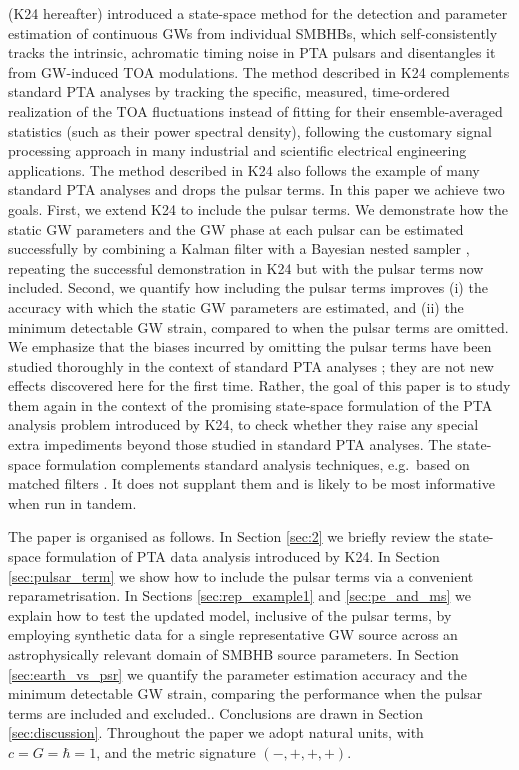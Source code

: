 \documentclass[fleqn,usenatbib,useAMS]{mnras}
\begin{document}
\cite{KimpsonPTA} (K24 hereafter) introduced a state-space method for the detection and parameter estimation of continuous GWs from individual SMBHBs, which self-consistently tracks the intrinsic, achromatic timing noise in PTA pulsars \citep[e.g.][]{Shannon2010,Lasky2015,Caballero2016,Goncharov2021} and disentangles it from GW-induced TOA modulations. The method described in K24 complements standard PTA analyses by tracking the specific, measured, time-ordered realization of the TOA fluctuations instead of fitting for their ensemble-averaged statistics (such as their power spectral density), following the customary signal processing approach in many industrial and scientific electrical engineering applications. The method described in K24 also follows the example of many standard PTA analyses and drops the pulsar terms. In this paper we achieve two goals. First, we extend K24 to include the pulsar terms. We demonstrate how the static GW parameters and the GW phase at each pulsar can be estimated successfully by combining a Kalman filter \citep{Kalman1} with a Bayesian nested sampler \citep{Skilling, Ashton2022}, repeating the successful demonstration in K24 but with the pulsar terms now included. Second, we quantify how including the pulsar terms improves (i) the accuracy with which the static GW parameters are estimated, and (ii) the minimum detectable GW strain, compared to when the pulsar terms are omitted. We emphasize that the biases incurred by omitting the pulsar terms have been studied thoroughly in the context of standard PTA analyses \citep{Zhupulsarterms,Chen2022}; they are not new effects discovered here for the first time. Rather, the goal of this paper is to study them again in the context of the promising state-space formulation of the PTA analysis problem introduced by K24, to check whether they raise any special extra impediments beyond those studied in standard PTA analyses. The state-space formulation complements standard analysis techniques, e.g.\ based on matched filters \citep{PhysRevD.79.084030,PhysRevD.91.044048}. It does not supplant them and is likely to be most informative when run in tandem. \newline 



The paper is organised as follows. In Section \ref{sec:2} we briefly review the state-space formulation of PTA data analysis introduced by K24. In Section \ref{sec:pulsar_term} we show how to include the pulsar terms via a convenient reparametrisation. In Sections \ref{sec:rep_example1} and \ref{sec:pe_and_ms} we explain how to test the updated model, inclusive of the pulsar terms, by employing synthetic data for a single representative GW source across an astrophysically relevant domain of SMBHB source parameters. In Section \ref{sec:earth_vs_psr} we quantify the parameter estimation accuracy and the minimum detectable GW strain, comparing the performance when the pulsar terms are included and excluded.. Conclusions are drawn in Section \ref{sec:discussion}. Throughout the paper we adopt natural units, with $c = G = \hbar = 1$, and the metric signature $(-,+,+,+)$. \newline 
\end{document}
